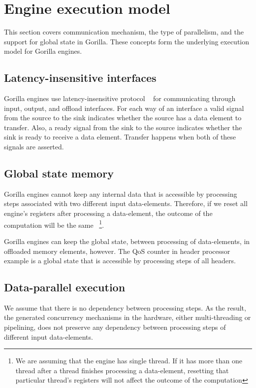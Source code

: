 \documentclass[a4paper, 12pt]{report}
\begin{document}
\section{Engine execution model}
This section covers communication mechanism, the type of 
parallelism, and the support for global state in Gorilla. 
These concepts form the underlying execution model for 
Gorilla engines. 
  
\subsection{Latency-insensitive interfaces}
\label{sec:latencyInsensitive}
Gorilla engines use latency-insensitive protocol
~\cite{theoryOfLatencyInsenssitiveDesigns} for 
communicating through input, output, and offload 
interfaces. For each way of an interface a valid 
signal from the source to the sink indicates whether 
the source has a data element to transfer. Also, a 
ready signal from the sink to the source indicates 
whether the sink is ready to receive a data 
element. Transfer happens when both of these signals 
are asserted.

\subsection{Global state memory}
Gorilla engines cannot keep any internal data that is 
accessible by processing steps associated with two 
different input data-elements. Therefore, if we reset all 
engine's registers after processing a data-element, 
the outcome of the computation  will be the same
~\footnote{We are assuming 
that the engine has single thread. If it has more than 
one thread after a thread finishes processing a data-element,  
resetting that particular thread's registers will not affect 
the outcome of the computation}.

Gorilla engines can keep the global state, between 
processing of data-elements, in offloaded memory 
elements, however. The QoS counter in header processor 
example is a global state that is accessible by 
processing steps of all headers.

\subsection{Data-parallel execution}
We assume that there is no dependency 
between processing steps. As the result, 
the generated concurrency mechanisms in 
the hardware, either multi-threading or 
pipelining, does not preserve any dependency 
between processing steps of different 
input data-elements. 
\end{document}
